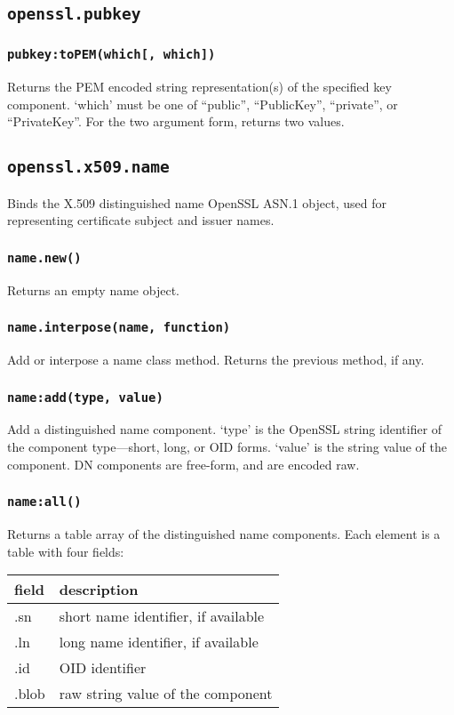\documentclass[11pt, oneside]{memoir}
\newcommand*{\fn}[1]{\texttt{#1}\xspace}
\newcounter{toccols}
\newenvironment{Module}[1]{
	\subsection{\texttt{#1}}
	\addtocontents{toc}{
		\protect\begin{multicols}{\value{toccols}}
	}
}{
	\addtocontents{toc}{\protect\end{multicols}}
}
\begin{document}
\begin{Module}{openssl.pubkey}
\subsubsection[\fn{pubkey:toPEM}]{\fn{pubkey:toPEM(which[, which])}}

Returns the PEM encoded string representation(s) of the specified key component. `which' must be one of ``public'', ``PublicKey'', ``private'', or ``PrivateKey''. For the two argument form, returns two values.

\end{Module}


\begin{Module}{openssl.x509.name}

Binds the X.509 distinguished name OpenSSL ASN.1 object, used for representing certificate subject and issuer names.

\subsubsection[\fn{name.new}]{\fn{name.new()}}

Returns an empty name object.

\subsubsection[\fn{name.interpose}]{\fn{name.interpose(name, function)}}

Add or interpose a name class method. Returns the previous method, if any.

\subsubsection[\fn{name:add}]{\fn{name:add(type, value)}}

Add a distinguished name component. `type' is the OpenSSL string identifier of the component type---short, long, or OID forms. `value' is the string value of the component. DN components are free-form, and are encoded raw.

\subsubsection[\fn{name:all}]{\fn{name:all()}}

Returns a table array of the distinguished name components. Each element is a table with four fields:

\begin{tabular}{ l | l}
field & description\\\hline
.sn & short name identifier, if available\\
.ln & long name identifier, if available\\
.id & OID identifier\\
.blob & raw string value of the component
\end{tabular}


\end{Module}
\end{document}
